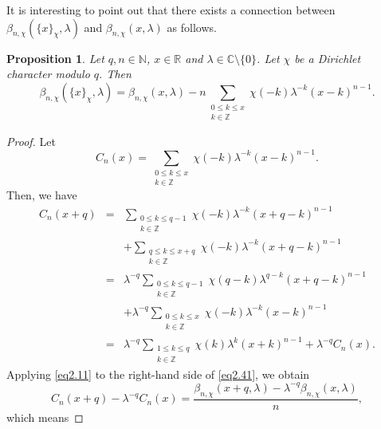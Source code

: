 \documentclass[reqno]{amsart}
\numberwithin{equation}{section}
\newtheorem{proposition}[thm]{Proposition}
\begin{document}
It is interesting to point out that there exists a connection between $\beta_{n,\chi}(\{x\}_{\chi},\lambda)$ and $\beta_{n,\chi}(x,\lambda)$ as follows.

\begin{proposition}\label{pro2.8} Let $q,n\in\mathbb{N}$, $x\in\mathbb{R}$ and $\lambda\in\mathbb{C}\setminus\{0\}$. Let $\chi$ be a Dirichlet character modulo $q$. Then
\begin{equation}\label{eq2.40}
\beta_{n,\chi}(\{x\}_{\chi},\lambda)=\beta_{n,\chi}(x,\lambda)-n\underset{\substack{0\leqslant k\leqslant x\\ k\in\mathbb{Z}}}{\sum}\chi(-k)\lambda^{-k}(x-k)^{n-1}.
\end{equation}
\end{proposition}

\begin{proof}
Let
\begin{equation*}
C_{n}(x)=\underset{\substack{0\leqslant k\leqslant x\\ k\in\mathbb{Z}}}{\sum}\chi(-k)\lambda^{-k}(x-k)^{n-1}.
\end{equation*}
Then, we have
\begin{eqnarray}\label{eq2.41}
C_{n}(x+q)&=&\underset{\substack{0\leqslant k\leqslant q-1\\ k\in\mathbb{Z}}}{\sum}\chi(-k)\lambda^{-k}(x+q-k)^{n-1}\nonumber\\
&&+\underset{\substack{q\leqslant k\leqslant x+q\\ k\in\mathbb{Z}}}{\sum}\chi(-k)\lambda^{-k}(x+q-k)^{n-1}\nonumber\\
&=&\lambda^{-q}\underset{\substack{0\leqslant k\leqslant q-1\\ k\in\mathbb{Z}}}{\sum}\chi(q-k)\lambda^{q-k}(x+q-k)^{n-1}\nonumber\\
&&+\lambda^{-q}\underset{\substack{0\leqslant k\leqslant x\\ k\in\mathbb{Z}}}{\sum}\chi(-k)\lambda^{-k}(x-k)^{n-1}\nonumber\\
&=&\lambda^{-q}\underset{\substack{1\leqslant k\leqslant q\\ k\in\mathbb{Z}}}{\sum}\chi(k)\lambda^{k}(x+k)^{n-1}+\lambda^{-q}C_{n}(x).
\end{eqnarray}
Applying \eqref{eq2.11} to the right-hand side of \eqref{eq2.41}, we obtain
\begin{equation*}
C_{n}(x+q)-\lambda^{-q}C_{n}(x)=\frac{\beta_{n,\chi}(x+q,\lambda)-\lambda^{-q}\beta_{n,\chi}(x,\lambda)}{n},
\end{equation*}
which means

\end{proof}
\end{document}

